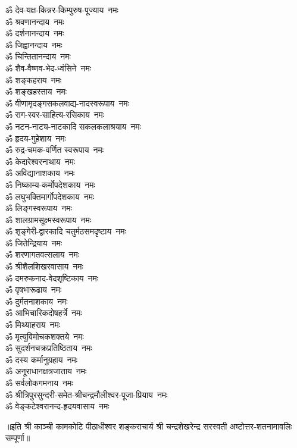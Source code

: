 \begin{flushleft}
\begin{multicols}{2}
ॐ देव-यक्ष-किन्नर-किम्पुरुष-पूज्याय~नमः\\
ॐ श्रवणानन्दाय~नमः\\
ॐ दर्शनानन्दाय~नमः\\
ॐ जिह्वानन्दाय~नमः\\
ॐ चिन्तितानन्दाय~नमः\\
ॐ शैव-वैष्णव-भेद-ध्वंसिने~नमः\\
ॐ शङ्कहराय~नमः\hfill{}\\
ॐ शङ्खहस्ताय~नमः\\
ॐ वीणामृदङ्गसकलवाद्य-नादस्वरूपाय~नमः\\
ॐ राग-स्वर-साहित्य-रसिकाय~नमः\\
ॐ नटन-नाट्य-नाटकादि सकलकलाश्रयाय~नमः\\
ॐ हृदय-गुहेशाय~नमः\\
ॐ रुद्र-चमक-वर्णित स्वरूपाय~नमः\\
ॐ केदारेश्वरनाथाय~नमः\\
ॐ अविद्यानाशकाय~नमः\\
ॐ निष्काम्य-कर्मोपदेशकाय~नमः\\
ॐ लघुभक्तिमार्गोपदेशकाय~नमः\hfill{}\\
ॐ लिङ्गस्वरूपाय~नमः\\
ॐ शालग्रामसूक्ष्मस्वरूपाय~नमः\\
ॐ शृङ्गेरी-द्वारकादि चतुर्मठसमदृष्टाय~नमः\\
ॐ जितेन्द्रियाय~नमः\\
ॐ शरणागतवत्सलाय~नमः\\
ॐ श्रीशैलशिखरवासाय~नमः\\
ॐ दमरुकनाद-वेदशृष्टिकाय~नमः\\
ॐ वृषभारूढाय~नमः\\
ॐ दुर्मतनाशकाय~नमः\\
ॐ आभिचारिकदोषहर्त्रे~नमः\hfill{}\\
ॐ मिथ्याहराय~नमः\\
ॐ मृत्युविमोचकशक्तये~नमः\\
ॐ सुदर्शनचक्रप्रतिष्ठिताय~नमः\\
ॐ दस्य कर्मानुग्रहाय~नमः\\
ॐ अनूराधानक्षत्रजाताय~नमः\\
ॐ सर्वलोकगमनाय~नमः\\
ॐ श्रीत्रिपुरसुन्दरी-समेत-श्रीचन्द्रमौलीश्वर-पूजा-प्रियाय~नमः\\
ॐ वेङ्कटेश्वरानन्द-हृदयवासाय~नमः\\
\end{multicols}
\end{flushleft}
{\centering ॥इति श्री काञ्ची कामकोटि पीठाधीश्वर शङ्कराचार्य श्री चन्द्रशेखरेन्द्र सरस्वती अष्टोत्तर-शतनामावलिः सम्पूर्णा॥}
